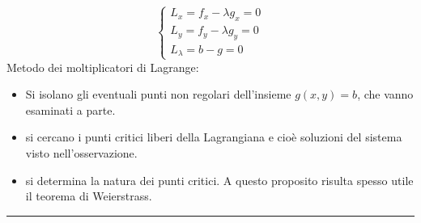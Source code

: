 \begin{tcolorbox}
\begin{itemize}
    \[
        \begin{cases}
            L_x = f_x - \lambda g_x  = 0\\
            L_y = f_y - \lambda g_y = 0\\
            L_\lambda = b-g = 0
        \end{cases}
    \]
    Metodo dei moltiplicatori di Lagrange:
    \begin{itemize}
        \item Si isolano gli eventuali punti non regolari dell'insieme $g(x,y) = b$, che vanno esaminati a parte.
        \item si cercano i punti critici liberi della Lagrangiana e cioè soluzioni del sistema visto nell'osservazione.
        \item si determina la natura dei punti critici. A questo proposito risulta spesso utile il teorema di Weierstrass.
    \end{itemize}
\end{itemize}
\end{tcolorbox}
\rule{\textwidth}{0,4pt}
